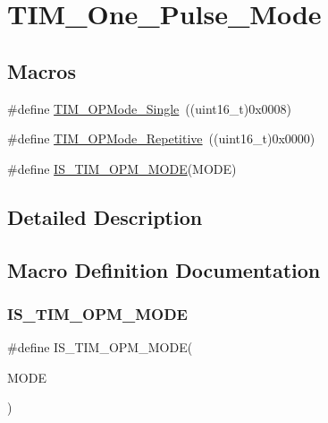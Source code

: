 \hypertarget{group___t_i_m___one___pulse___mode}{}\section{T\+I\+M\+\_\+\+One\+\_\+\+Pulse\+\_\+\+Mode}
\label{group___t_i_m___one___pulse___mode}
\subsection*{Macros}
\begin{DoxyCompactItemize}
\item 
\#define \mbox{\hyperlink{group___t_i_m___one___pulse___mode_ga99d934fdbc54ea4ee2cf5c86860f9227}{T\+I\+M\+\_\+\+O\+P\+Mode\+\_\+\+Single}}~((uint16\+\_\+t)0x0008)
\item 
\#define \mbox{\hyperlink{group___t_i_m___one___pulse___mode_gad921d739c86bf48dca12442a81ad68ad}{T\+I\+M\+\_\+\+O\+P\+Mode\+\_\+\+Repetitive}}~((uint16\+\_\+t)0x0000)
\item 
\#define \mbox{\hyperlink{group___t_i_m___one___pulse___mode_ga3f4a4305b4feacb4322eb4a358e54637}{I\+S\+\_\+\+T\+I\+M\+\_\+\+O\+P\+M\+\_\+\+M\+O\+DE}}(M\+O\+DE)
\end{DoxyCompactItemize}


\subsection{Detailed Description}


\subsection{Macro Definition Documentation}
\mbox{\label{group___t_i_m___one___pulse___mode_ga3f4a4305b4feacb4322eb4a358e54637}} 
\subsubsection{\texorpdfstring{IS\_TIM\_OPM\_MODE}{IS\_TIM\_OPM\_MODE}}
{\footnotesize\ttfamily \#define I\+S\+\_\+\+T\+I\+M\+\_\+\+O\+P\+M\+\_\+\+M\+O\+DE(\begin{DoxyParamCaption}\item[{}]{M\+O\+DE }\end{DoxyParamCaption})}


